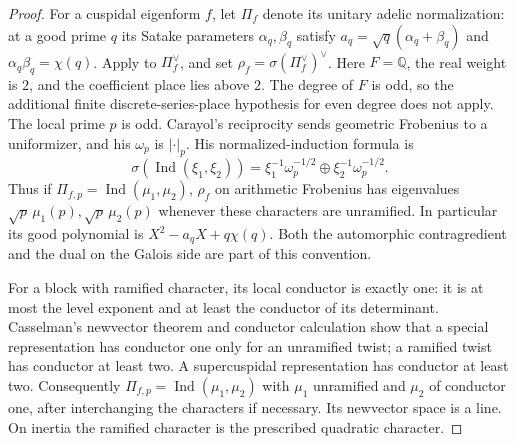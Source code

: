 \documentclass[11pt]{article}
\theoremstyle{definition}
\theoremstyle{remark}
\newcommand{\Q}{\mathbb Q}
\begin{document}
\begin{proof}
For a cuspidal eigenform $f$, let $\Pi_f$ denote its unitary
adelic normalization: at a good prime $q$ its Satake parameters
$\alpha_q,\beta_q$ satisfy
$a_q=\sqrt q(\alpha_q+\beta_q)$ and
$\alpha_q\beta_q=\chi(q)$.
Apply \cite[\S\S0.3--0.7, Theorem~A, pp.~409--411]{carayol}
to $\Pi_f^\vee$, and set $\rho_f=\sigma(\Pi_f^\vee)^\vee$.
Here $F=\Q$, the real weight is $2$, and the coefficient place
lies above $2$. The degree of $F$ is odd, so the additional
finite discrete-series-place hypothesis for even degree does
not apply. The local prime $p$ is odd.
Carayol's reciprocity sends geometric Frobenius to a uniformizer,
and his $\omega_p$ is $|\cdot|_p$.
His normalized-induction formula is
\[
 \sigma(\operatorname{Ind}(\xi_1,\xi_2))
 =\xi_1^{-1}\omega_p^{-1/2}\oplus
   \xi_2^{-1}\omega_p^{-1/2}.
\]
Thus if $\Pi_{f,p}=\operatorname{Ind}(\mu_1,\mu_2)$,
$\rho_f$ on arithmetic Frobenius has eigenvalues
$\sqrt p\,\mu_1(p),\sqrt p\,\mu_2(p)$ whenever these
characters are unramified. In particular its good polynomial
is $X^2-a_qX+q\chi(q)$. Both the automorphic contragredient and
the dual on the Galois side are part of this convention.

For a block with ramified character, its local conductor is
exactly one: it is at most the level exponent and at least the
conductor of its determinant.
Casselman's newvector theorem and conductor calculation
\cite[Theorem~1, pp.~302--306]{casselman} show that a special
representation has conductor one only for an unramified twist;
a ramified twist has conductor at least two. A supercuspidal
representation has conductor at least two. Consequently
$\Pi_{f,p}=\operatorname{Ind}(\mu_1,\mu_2)$ with $\mu_1$
unramified and $\mu_2$ of conductor one, after interchanging
the characters if necessary. Its newvector space is a line.
On inertia the ramified character is the prescribed quadratic
character.


\end{proof}
\end{document}

